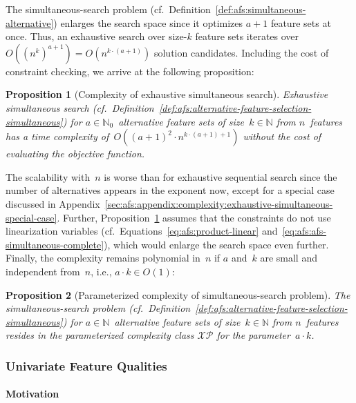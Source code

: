 \documentclass{article}
\newtheorem{proposition}{Proposition}
\theoremstyle{definition}
\begin{document}
The simultaneous-search problem (cf.~Definition~\ref{def:afs:simultaneous-alternative}) enlarges the search space since it optimizes $a+1$ feature sets at once.
Thus, an exhaustive search over size-$k$ feature sets iterates over~$O((n^k)^{a+1}) = O(n^{k \cdot (a+1)})$ solution candidates.
Including the cost of constraint checking, we arrive at the following proposition:
%
\begin{proposition}[Complexity of exhaustive simultaneous search]
	Exhaustive simultaneous search (cf.~Definition~\ref{def:afs:alternative-feature-selection-simultaneous}) for $a \in \mathbb{N}_0$~alternative feature sets of size~$k \in \mathbb{N}$ from $n$~features has a time complexity of~$O((a+1)^2 \cdot n^{k \cdot (a+1) + 1})$ without the cost of evaluating the objective function.
	\label{prop:afs:complexity-exhaustive-simultaneuos}
\end{proposition}
%
The scalability with~$n$ is worse than for exhaustive sequential search since the number of alternatives appears in the exponent now, except for a special case discussed in Appendix~\ref{sec:afs:appendix:complexity:exhaustive-simultaneous-special-case}.
Further, Proposition~\ref{prop:afs:complexity-exhaustive-simultaneuos} assumes that the constraints do not use linearization variables (cf.~Equations~\ref{eq:afs:product-linear} and~\ref{eq:afs:afs-simultaneous-complete}), which would enlarge the search space even further.
Finally, the complexity remains polynomial in~$n$ if $a$ and~$k$ are small and independent from~$n$, i.e., $a \cdot k \in O(1)$:
%
\begin{proposition}[Parameterized complexity of simultaneous-search problem]
	The simultaneous-search problem (cf.~Definition~\ref{def:afs:alternative-feature-selection-simultaneous}) for $a \in \mathbb{N}$~alternative feature sets of size~$k \in \mathbb{N}$ from $n$~features resides in the parameterized complexity class $\mathcal{XP}$ for the parameter~$a \cdot k$.
	\label{prop:afs:complexity-simultaneuos-xp}
\end{proposition}

\subsubsection{Univariate Feature Qualities}
\label{sec:afs:approach:complexity:univariate}

\paragraph{Motivation}
\end{document}
